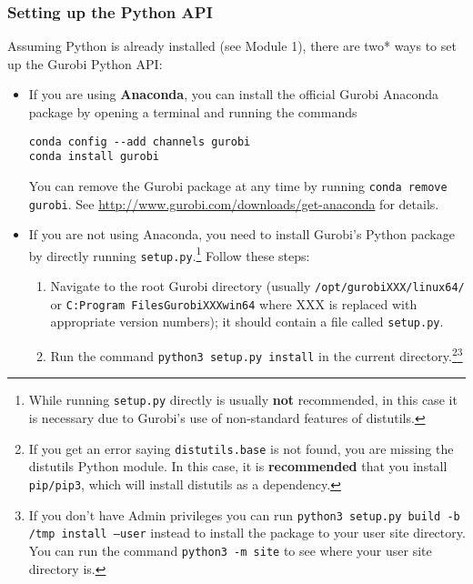 \documentclass[12pt]{article}
\begin{document}
\subsubsection{Setting up the Python API}
Assuming Python is already installed (see Module 1), there are two* ways to set up the Gurobi Python API:
\begin{itemize}
    \item If you are using \textbf{Anaconda}, you can install the official Gurobi Anaconda package by opening a terminal and running the commands
\begin{verbatim}
conda config --add channels gurobi
conda install gurobi
\end{verbatim}
        You can remove the Gurobi package at any time by running \texttt{conda remove gurobi}.
        See \url{http://www.gurobi.com/downloads/get-anaconda} for details.
    \item If you are not using Anaconda, you need to install Gurobi's Python package by directly running \texttt{setup.py}.\footnote{
            While running \texttt{setup.py} directly is usually \textbf{not} recommended, in this case it is necessary due to Gurobi's use of non-standard features of distutils.
        }
        Follow these steps:
        \begin{enumerate}
            \item Navigate to the root Gurobi directory (usually \texttt{/opt/gurobiXXX/linux64/} or \texttt{C:Program FilesGurobiXXXwin64} where XXX is replaced with appropriate version numbers); it should contain a file called \texttt{setup.py}.
            \item Run the command \texttt{python3 setup.py install} in the current directory.\footnote{
                If you get an error saying \texttt{distutils.base} is not found, you are missing the distutils Python module.
                In this case, it is \textbf{recommended} that you install \texttt{pip/pip3}, which will install distutils as a dependency.
                }\footnote{
                    If you don't have Admin privileges you can run \texttt{python3 setup.py build -b /tmp install --user} instead to install the package to your user site directory. 
                    You can run the command \texttt{python3 -m site} to see where your user site directory is.
                }
        \end{enumerate}

\end{itemize}
\end{document}
